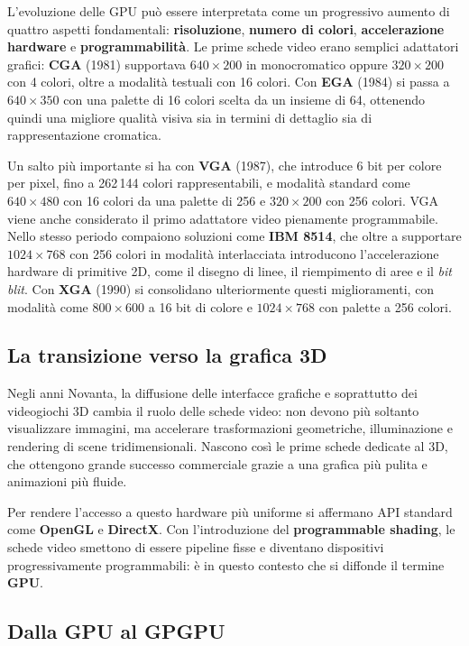 L'evoluzione delle GPU può essere interpretata come un progressivo aumento di quattro aspetti fondamentali: \textbf{risoluzione}, \textbf{numero di colori}, \textbf{accelerazione hardware} e \textbf{programmabilità}. Le prime schede video erano semplici adattatori grafici: \textbf{CGA} (1981) supportava $640\times 200$ in monocromatico oppure $320\times 200$ con 4 colori, oltre a modalità testuali con 16 colori. Con \textbf{EGA} (1984) si passa a $640\times 350$ con una palette di 16 colori scelta da un insieme di 64, ottenendo quindi una migliore qualità visiva sia in termini di dettaglio sia di rappresentazione cromatica.

Un salto più importante si ha con \textbf{VGA} (1987), che introduce 6 bit per colore per pixel, fino a 262\,144 colori rappresentabili, e modalità standard come $640\times 480$ con 16 colori da una palette di 256 e $320\times 200$ con 256 colori. VGA viene anche considerato il primo adattatore video pienamente programmabile. Nello stesso periodo compaiono soluzioni come \textbf{IBM 8514}, che oltre a supportare $1024\times 768$ con 256 colori in modalità interlacciata introducono l'accelerazione hardware di primitive 2D, come il disegno di linee, il riempimento di aree e il \emph{bit blit}. Con \textbf{XGA} (1990) si consolidano ulteriormente questi miglioramenti, con modalità come $800\times 600$ a 16 bit di colore e $1024\times 768$ con palette a 256 colori.

\subsection{La transizione verso la grafica 3D}

Negli anni Novanta, la diffusione delle interfacce grafiche e soprattutto dei videogiochi 3D cambia il ruolo delle schede video: non devono più soltanto visualizzare immagini, ma accelerare trasformazioni geometriche, illuminazione e rendering di scene tridimensionali. Nascono così le prime schede dedicate al 3D, che ottengono grande successo commerciale grazie a una grafica più pulita e animazioni più fluide.

Per rendere l'accesso a questo hardware più uniforme si affermano API standard come \textbf{OpenGL} e \textbf{DirectX}. Con l'introduzione del \textbf{programmable shading}, le schede video smettono di essere pipeline fisse e diventano dispositivi progressivamente programmabili: è in questo contesto che si diffonde il termine \textbf{GPU}.

\subsection{Dalla GPU al GPGPU}

